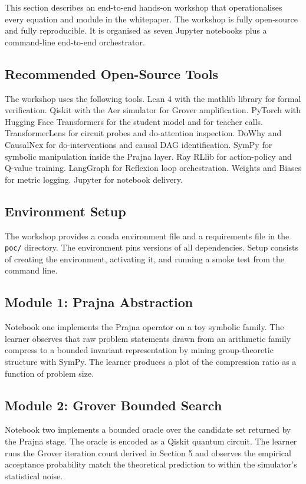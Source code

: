 This section describes an end-to-end hands-on workshop that operationalises every equation and module in the whitepaper. The workshop is fully open-source and fully reproducible. It is organised as seven Jupyter notebooks plus a command-line end-to-end orchestrator.

\subsection{Recommended Open-Source Tools}
The workshop uses the following tools. Lean 4 with the mathlib library for formal verification. Qiskit with the Aer simulator for Grover amplification. PyTorch with Hugging Face Transformers for the student model and for teacher calls. TransformerLens for circuit probes and do-attention inspection. DoWhy and CausalNex for do-interventions and causal DAG identification. SymPy for symbolic manipulation inside the Prajna layer. Ray RLlib for action-policy and Q-value training. LangGraph for Reflexion loop orchestration. Weights and Biases for metric logging. Jupyter for notebook delivery.

\subsection{Environment Setup}
The workshop provides a conda environment file and a requirements file in the \texttt{poc/} directory. The environment pins versions of all dependencies. Setup consists of creating the environment, activating it, and running a smoke test from the command line.

\subsection{Module 1: Prajna Abstraction}
Notebook one implements the Prajna operator on a toy symbolic family. The learner observes that raw problem statements drawn from an arithmetic family compress to a bounded invariant representation by mining group-theoretic structure with SymPy. The learner produces a plot of the compression ratio as a function of problem size.

\subsection{Module 2: Grover Bounded Search}
Notebook two implements a bounded oracle over the candidate set returned by the Prajna stage. The oracle is encoded as a Qiskit quantum circuit. The learner runs the Grover iteration count derived in Section 5 and observes the empirical acceptance probability match the theoretical prediction to within the simulator's statistical noise.

